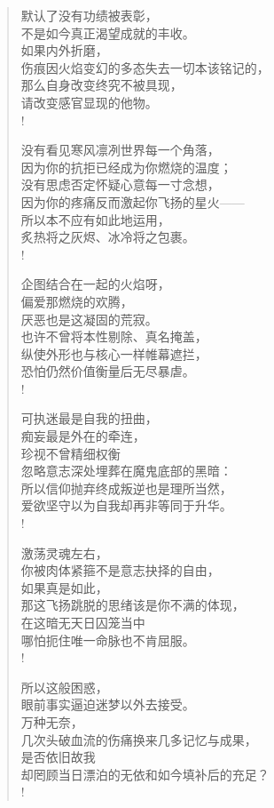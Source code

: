 \documentclass[UTF8, 12pt, a4paper]{ctexrep} %
\begin{document}
\begin{verse}
    默认了没有功绩被表彰，\\
    不是如今真正渴望成就的丰收。\\
    如果内外折磨，\\
    伤痕因火焰变幻的多态失去一切本该铭记的，\\
    那么自身改变终究不被具现，\\
    请改变感官显现的他物。\\!

    没有看见寒风凛冽世界每一个角落，\\
    因为你的抗拒已经成为你燃烧的温度；\\
    没有思虑否定怀疑心意每一寸念想，\\
    因为你的疼痛反而激起你飞扬的星火——\\
    所以本不应有如此地运用，\\
    炙热将之灰烬、冰冷将之包裹。\\!

    企图结合在一起的火焰呀，\\
    偏爱那燃烧的欢腾，\\
    厌恶也是这凝固的荒寂。\\
    也许不曾将本性剔除、真名掩盖，\\
    纵使外形也与核心一样帷幕遮拦，\\
    恐怕仍然价值衡量后无尽暴虐。\\!

    可执迷最是自我的扭曲，\\
    痴妄最是外在的牵连，\\
    珍视不曾精细权衡\\
    忽略意志深处埋葬在魔鬼底部的黑暗：\\
    所以信仰抛弃终成叛逆也是理所当然，\\
    爱欲坚守以为自我却再非等同于升华。\\!

    激荡灵魂左右，\\
    你被肉体紧箍不是意志抉择的自由，\\
    如果真是如此，\\
    那这飞扬跳脱的思绪该是你不满的体现，\\
    在这暗无天日囚笼当中\\
    哪怕扼住唯一命脉也不肯屈服。\\!

    所以这般困惑，\\
    眼前事实逼迫迷梦以外去接受。\\
    万种无奈，\\
    几次头破血流的伤痛换来几多记忆与成果，\\
    是否依旧故我\\
    却罔顾当日漂泊的无依和如今填补后的充足？\\!


\end{verse}
\end{document}
